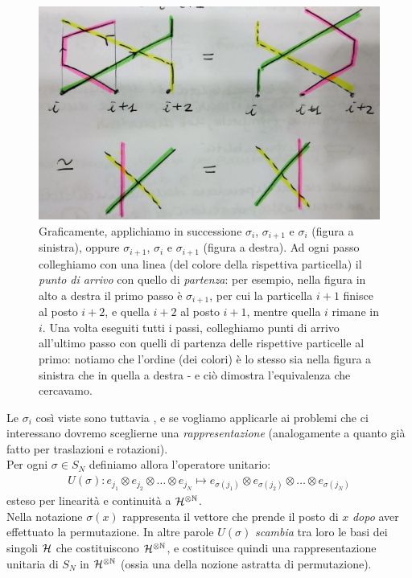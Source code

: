 \documentclass[../../FisicaTeorica.tex]{subfiles}
\begin{document}
\begin{enumerate}
\begin{figure}[H]
\centering
\includegraphics[scale=0.5]{Immagini/12_12/image004.jpg}
\caption{Graficamente, applichiamo in successione $\sigma_i$, $\sigma_{i+1}$ e $\sigma_i$ (figura a sinistra), oppure $\sigma_{i+1}$, $\sigma_i$ e $\sigma_{i+1}$ (figura a destra). Ad ogni passo colleghiamo con una linea (del colore della rispettiva particella) il \textit{punto di arrivo} con quello di \textit{partenza}: per esempio, nella figura in alto a destra il primo passo è $\sigma_{i+1}$, per cui la particella $i+1$ finisce al posto $i+2$, e quella $i+2$ al posto $i+1$, mentre quella $i$ rimane in $i$. Una volta eseguiti tutti i passi, colleghiamo punti di arrivo all'ultimo passo con quelli di partenza delle rispettive particelle al primo: notiamo che l'ordine (dei colori) è lo stesso sia nella figura a sinistra che in quella a destra - e ciò dimostra l'equivalenza che cercavamo.}
\end{figure}
\end{enumerate}
Le $\sigma_i$ così viste sono tuttavia , e se vogliamo applicarle ai problemi che ci interessano dovremo sceglierne una \textit{rappresentazione} (analogamente a quanto già fatto per traslazioni e rotazioni).\\
Per ogni $\sigma\in S_N$ definiamo allora l'operatore unitario:
\begin{align*}
U(\sigma): e_{j_1}\otimes e_{j_2}\otimes \dots \otimes e_{j_N} \mapsto e_{\sigma(j_1)} \otimes e_{\sigma(j_2)} \otimes \dots \otimes e_{\sigma(j_N)}
\end{align*}
esteso per linearità e continuità a $\mathcal{H}^{\otimes \mathbb{N}}$.\\
Nella notazione $\sigma(x)$ rappresenta il vettore che prende il posto di $x$ \textit{dopo} aver effettuato la permutazione. In altre parole $U(\sigma)$ \textit{scambia} tra loro le basi dei singoli $\mathcal{H}$ che costituiscono $\mathcal{H}^{\otimes\mathbb{N}}$, e costituisce quindi una rappresentazione unitaria di $S_N$ in $\mathcal{H}^{\otimes \mathbb{N}}$ (ossia una  della nozione astratta di permutazione).\\
\end{document}
